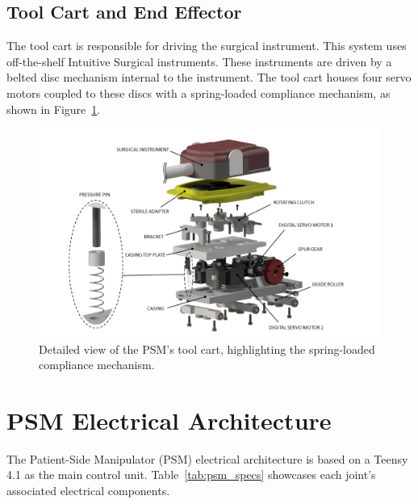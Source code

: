 \subsection{Tool Cart and End Effector}
The tool cart is responsible for driving the surgical instrument. This system uses off-the-shelf Intuitive Surgical instruments. These instruments are driven by a belted disc mechanism internal to the instrument. The tool cart houses four servo motors coupled to these discs with a spring-loaded compliance mechanism, as shown in Figure~\ref{fig:tool_cart_detailed}.

\begin{figure}[htb!]
    \centering
    \includegraphics[width=1.0\linewidth]{figures/tool_cart_detailed.png}
    \caption{Detailed view of the PSM's tool cart, highlighting the spring-loaded compliance mechanism. \cite{walder2022design}}
    \label{fig:tool_cart_detailed}
\end{figure}



\section{PSM Electrical Architecture}

The Patient-Side Manipulator (PSM) electrical architecture is based on a Teensy 4.1 as the main control unit. Table~\ref{tab:psm_specs} showcases each joint's associated electrical components.

